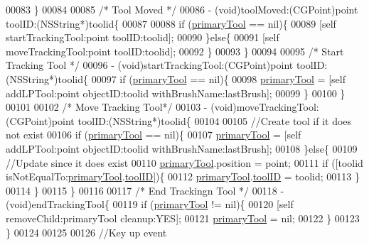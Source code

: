 \begin{DoxyCode}
00083 \}
00084 
00085 \textcolor{comment}{/* Tool Moved */}
00086 - (void)toolMoved:(CGPoint)point toolID:(NSString*)toolid\{
00087     
00088     \textcolor{keywordflow}{if} (\hyperlink{interface_h_u_d_layer_aad9b0e2b4164986e18ea0a9afcd1a914}{primaryTool} == nil)\{
00089         [\textcolor{keyword}{self} startTrackingTool:point toolID:toolid];
00090     \}\textcolor{keywordflow}{else}\{
00091         [\textcolor{keyword}{self} moveTrackingTool:point toolID:toolid];
00092     \}
00093 \}
00094 
00095 \textcolor{comment}{/* Start Tracking Tool */}
00096 - (void)startTrackingTool:(CGPoint)point toolID:(NSString*)toolid\{
00097     \textcolor{keywordflow}{if} (\hyperlink{interface_h_u_d_layer_aad9b0e2b4164986e18ea0a9afcd1a914}{primaryTool} == nil)\{
00098         \hyperlink{interface_h_u_d_layer_aad9b0e2b4164986e18ea0a9afcd1a914}{primaryTool} = [\textcolor{keyword}{self} addLPTool:point objectID:toolid withBrushName:lastBrush];
00099     \}
00100 \}
00101 
00102 \textcolor{comment}{/* Move Tracking Tool*/}
00103 - (void)moveTrackingTool:(CGPoint)point toolID:(NSString*)toolid\{
00104     
00105     \textcolor{comment}{//Create tool if it does not exist}
00106     \textcolor{keywordflow}{if} (\hyperlink{interface_h_u_d_layer_aad9b0e2b4164986e18ea0a9afcd1a914}{primaryTool} == nil)\{
00107         \hyperlink{interface_h_u_d_layer_aad9b0e2b4164986e18ea0a9afcd1a914}{primaryTool} = [\textcolor{keyword}{self} addLPTool:point objectID:toolid withBrushName:lastBrush];
00108     \}\textcolor{keywordflow}{else}\{
00109         \textcolor{comment}{//Update since it does exist}
00110         \hyperlink{interface_h_u_d_layer_aad9b0e2b4164986e18ea0a9afcd1a914}{primaryTool}.position =  point;
00111         \textcolor{keywordflow}{if} ([toolid isNotEqualTo:\hyperlink{interface_h_u_d_layer_aad9b0e2b4164986e18ea0a9afcd1a914}{primaryTool}.\hyperlink{interface_l_p_tool_aafbd850bbcc6c8e33ba201d45a8107c2}{toolID}])\{
00112             \hyperlink{interface_h_u_d_layer_aad9b0e2b4164986e18ea0a9afcd1a914}{primaryTool}.\hyperlink{interface_l_p_tool_aafbd850bbcc6c8e33ba201d45a8107c2}{toolID} = toolid;
00113         \}
00114     \}
00115 \}
00116 
00117 \textcolor{comment}{/* End Trackingn Tool */}
00118 - (void)endTrackingTool\{
00119     \textcolor{keywordflow}{if} (\hyperlink{interface_h_u_d_layer_aad9b0e2b4164986e18ea0a9afcd1a914}{primaryTool} != nil)\{
00120         [\textcolor{keyword}{self} removeChild:primaryTool cleanup:YES];
00121         \hyperlink{interface_h_u_d_layer_aad9b0e2b4164986e18ea0a9afcd1a914}{primaryTool} = nil;
00122     \}
00123 \}
00124 
00125 
00126 \textcolor{comment}{//Key up event}

\end{DoxyCode}
